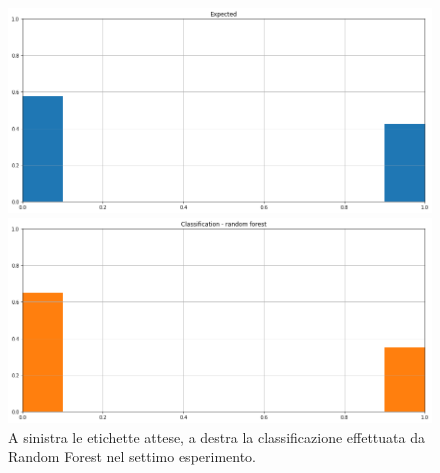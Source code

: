 \documentclass[12pt]{report}
\theoremstyle{definition}
\begin{document}
\begin{figure}
\centering
    \begin{minipage}{0.48\textwidth}
        \includegraphics[width=\linewidth]{images/experiment kaggle/expected_classification.png}
    \end{minipage}
    \begin{minipage}{0.48\textwidth}
        \includegraphics[width=\linewidth]{images/experiment kaggle/prediction_classification_rf.png}
    \end{minipage}
    \caption{A sinistra le etichette attese, a destra la classificazione effettuata da Random Forest nel settimo esperimento.}
    \label{rf_class_exp7}
\end{figure} 
\end{document}
